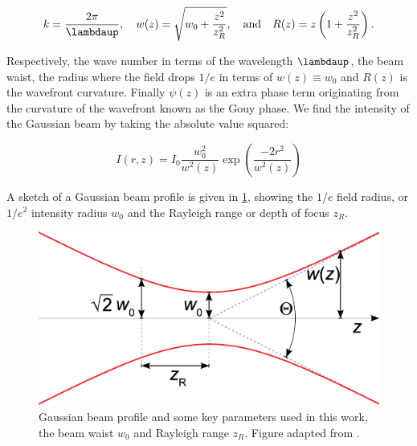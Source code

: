 \begin{equation}
	k = \frac{2\pi}{\lambdaup}, \quad 
	w(z) = \sqrt{w_0 + \frac{z^2}{z_R^2}}, \quad \text{and} \quad
	R(z) = z \left(1 + \frac{z^2}{z_R^2}\right).
\end{equation}

Respectively, the wave number in terms of the wavelength $\lambdaup$, the beam waist, the radius where the field drops $1/e$ in terms of $w(z)\equiv w_0$ and $R(z)$ is the wavefront curvature. Finally $\psi(z)$ is an extra phase term originating from the curvature of the wavefront known as the Gouy phase. We find the intensity of the Gaussian beam by taking the absolute value squared:

\begin{equation}\label{GaussianBeamIntensity}
	I(r,z) = I_0 \frac{w_0^2}{w^2(z)} \exp{\left(\frac{-2r^2}{w^2(z)}\right)}
\end{equation}

A sketch of a Gaussian beam profile is given in \cref{fig:GaussianBeam}, showing the $1/e$ field radius, or $1/e^2$ intensity radius $w_0$ and the Rayleigh range or depth of focus $z_R$. 

\begin{figure}
	\centering
	\includegraphics[width=0.4\linewidth]{figures/GaussianBeam.pdf}
	\caption{Gaussian beam profile and some key parameters used in this work, the beam waist $w_0$ and Rayleigh range $z_R$. Figure adapted from \cite{Hermans2009}.}
	\label{fig:GaussianBeam}
\end{figure}

